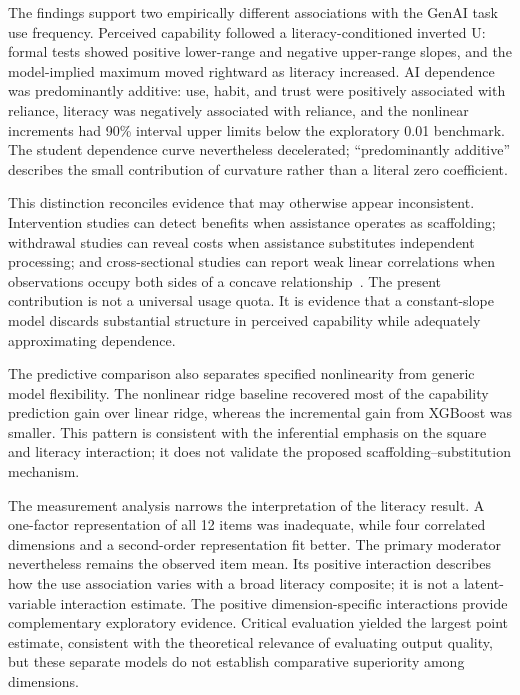 \documentclass[sustainability,article,accept,moreauthors]{Definitions/mdpi}
\begin{document}
The findings support two empirically different associations with the GenAI task use frequency. Perceived capability followed a literacy-conditioned inverted U: formal tests showed positive lower-range and negative upper-range slopes, and the model-implied maximum moved rightward as literacy increased. AI dependence was predominantly additive: use, habit, and trust were positively associated with reliance, literacy was negatively associated with reliance, and the nonlinear increments had 90\% interval upper limits below the exploratory 0.01 benchmark. The student dependence curve nevertheless decelerated; ``predominantly additive'' describes the small contribution of curvature rather than a literal zero coefficient.

This distinction reconciles evidence that may otherwise appear inconsistent. Intervention studies can detect benefits when assistance operates as scaffolding; withdrawal studies can reveal costs when assistance substitutes independent processing; and cross-sectional studies can report weak linear correlations when observations occupy both sides of a concave relationship~\cite{bauer2025,bastani2025,abbas2024}. The present contribution is not a universal usage quota. It is evidence that a constant-slope model discards substantial structure in perceived capability while adequately approximating dependence.

The predictive comparison also separates specified nonlinearity from generic model flexibility. The nonlinear ridge baseline recovered most of the capability prediction gain over linear ridge, whereas the incremental gain from XGBoost was smaller. This pattern is consistent with the inferential emphasis on the square and literacy interaction; it does not validate the proposed scaffolding--substitution mechanism.

The measurement analysis narrows the interpretation of the literacy result. A one-factor representation of all 12 items was inadequate, while four correlated dimensions and a second-order representation fit better. The primary moderator nevertheless remains the observed item mean. Its positive interaction describes how the use association varies with a broad literacy composite; it is not a latent-variable interaction estimate. The positive dimension-specific interactions provide complementary exploratory evidence. Critical evaluation yielded the largest point estimate, consistent with the theoretical relevance of evaluating output quality, but these separate models do not establish comparative superiority among dimensions.
\end{document}
